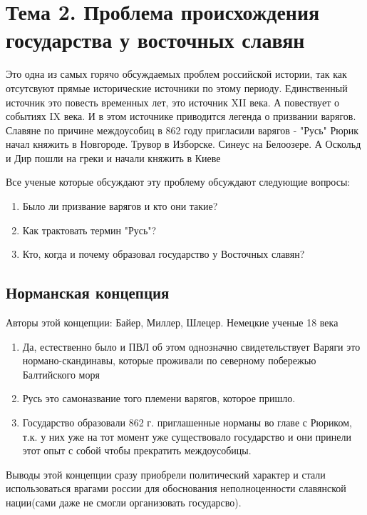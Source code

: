 \documentclass[a4paper]{article}
\begin{document}
\section{Тема 2. Проблема происхождения государства у восточных славян}
Это одна из самых горячо обсуждаемых проблем российской истории, так как отсутсвуют прямые исторические источники по этому периоду.
Единственный источник это повесть временных лет, это источник XII века. А повествует о событиях IX века. И в этом источнике приводится легенда о призвании варягов.
Славяне по причине междоусобиц в 862 году пригласили варягов - "Русь"
Рюрик начал княжить в Новгороде. Трувор в Изборске. Синеус на Белоозере.
А Оскольд и Дир пошли на греки и начали княжить в Киеве

Все ученые которые обсуждают эту проблему обсуждают следующие вопросы:
\begin{enumerate}
    \item Было ли призвание варягов и кто они такие?
    \item Как трактовать термин "Русь"?
    \item Кто, когда и почему образовал государство у Восточных славян?
\end{enumerate}

\subsection{Норманская концепция}
Авторы этой концепции: Байер, Миллер, Шлецер. Немецкие ученые 18 века
\begin{enumerate}
    \item Да, естественно было и ПВЛ об этом однозначно свидетельствует
    Варяги это нормано-скандинавы, которые проживали по северному побережью Балтийского моря
    \item Русь это самоназвание того племени варягов, которое пришло.
    \item Государство образовали 862 г. приглашенные норманы во главе с Рюриком, т.к. у них уже на тот момент уже существовало государство и они принели этот опыт с собой чтобы прекратить междоусобицы.
\end{enumerate}
Выводы этой концепции сразу приобрели политический характер и стали использоваться врагами россии для обоснования неполноценности славянской нации(сами даже не смогли организовать государсво).
\end{document}

